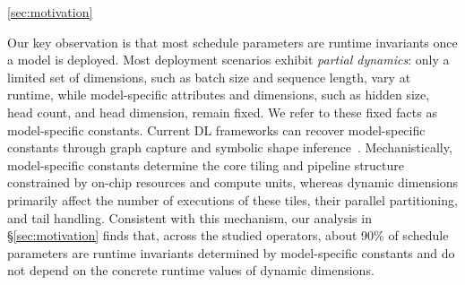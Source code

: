 {\color{red}%
\mbox{\cite{shen2021nimble,zheng2023bladedisc,Lai2023RelaxCA,ansel2024dynamo}}\hspace{0pt}\ref{sec:motivation}
\par}
{\color{blue}%
Our key observation is that most schedule parameters are runtime invariants once a model is deployed. Most deployment scenarios exhibit \emph{partial dynamics}: only a limited set of dimensions, such as batch size and sequence length, vary at runtime, while model-specific attributes and dimensions, such as hidden size, head count, and head dimension, remain fixed. We refer to these fixed facts as model-specific constants. Current DL frameworks can recover model-specific constants through graph capture and symbolic shape inference~\cite{shen2021nimble,zheng2023bladedisc,Lai2023RelaxCA,ansel2024dynamo}. Mechanistically, model-specific constants determine the core tiling and pipeline structure constrained by on-chip resources and compute units, whereas dynamic dimensions primarily affect the number of executions of these tiles, their parallel partitioning, and tail handling. Consistent with this mechanism, our analysis in \S\ref{sec:motivation} finds that, across the studied operators, about 90\% of schedule parameters are runtime invariants determined by model-specific constants and do not depend on the concrete runtime values of dynamic dimensions.
\par}

